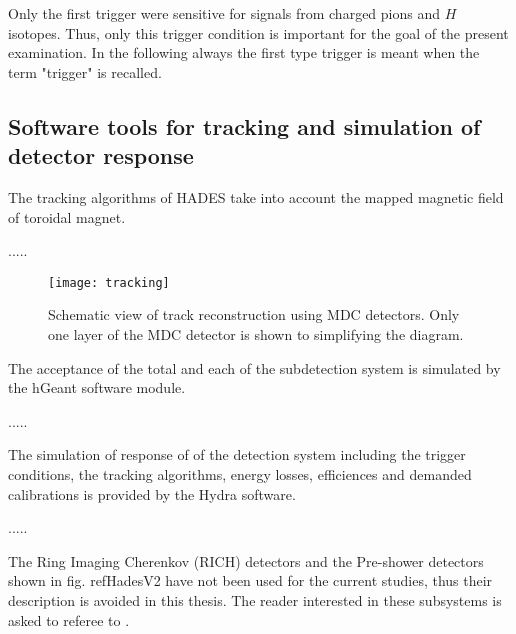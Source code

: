 Only the first trigger were sensitive for signals from charged pions and $H$ isotopes. 
Thus, only this trigger condition is important for the goal of the present examination. 
In the following always the first type trigger is meant when the term "trigger" is recalled.

\subsection{Software tools for tracking and simulation of detector response}

The tracking algorithms of HADES take into account the mapped magnetic field of toroidal magnet.

.....


\begin{figure}
	\centering
	\texttt{[image: tracking]}
	\caption{Schematic view of track reconstruction using MDC detectors. Only one layer of the MDC detector is shown to simplifying the diagram.  }
	\label{tracking}
\end{figure}


The acceptance of the total and each of the subdetection system is simulated 
by the hGeant software module.

.....

The simulation of response of of the detection system including the trigger conditions, the tracking algorithms, energy losses, efficiences 
and demanded calibrations is provided by the Hydra software.   


.....


 




















The Ring Imaging Cherenkov (RICH) detectors and the Pre-shower detectors shown in fig. ref{HadesV2} have not been used for the current studies, 
thus their description is avoided in this thesis. The reader interested in these subsystems is asked to referee to \cite{agakichiev2009HADES}.






